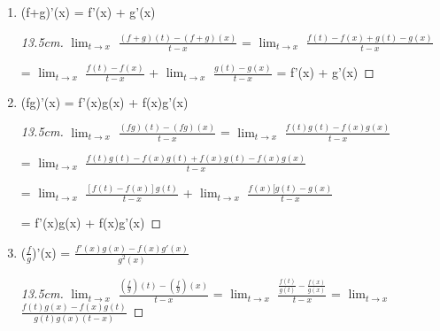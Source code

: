    \begin{enumerate}[label=(\alph*), leftmargin=1cm, itemsep=0.1cm]
        \item (f+g)'(x) = f'(x) + g'(x)
        
            \begin{proof}[13.5cm]
                $\lim_{t \rightarrow x}$ $\frac{(f+g)(t) - (f+g)(x)}{t - x}$
                = $\lim_{t \rightarrow x}$ $\frac{f(t) - f(x) + g(t) - g(x)}{t - x}$
                
                \hspace{4cm}
                = $\lim_{t \rightarrow x}$ $\frac{f(t) - f(x)}{t - x}$
                + $\lim_{t \rightarrow x}$ $\frac{g(t) - g(x)}{t - x}$
                = f'(x) + g'(x)
            \end{proof}
        
        \item (fg)'(x) = f'(x)g(x) + f(x)g'(x)

            \begin{proof}[13.5cm]
                $\lim_{t \rightarrow x}$ $\frac{(fg)(t) - (fg)(x)}{t - x}$
                = $\lim_{t \rightarrow x}$ $\frac{f(t)g(t) - f(x)g(x)}{t - x}$

                \hspace{3.5cm}
                = $\lim_{t \rightarrow x}$ $\frac{f(t)g(t)-f(x)g(t)+f(x)g(t)-f(x)g(x)}
                                                {t - x}$
                
                \hspace{3.5cm}
                = $\lim_{t \rightarrow x}$ $\frac{[f(t)-f(x)]g(t)}{t - x}$
                + $\lim_{t \rightarrow x}$ $\frac{f(x)[g(t)-g(x)}{t - x}$
                
                \hspace{3.5cm}
                = f'(x)g(x) + f(x)g'(x)
            \end{proof}

        \item ($\frac{f}{g}$)'(x) = $\frac{f'(x)g(x) - f(x)g'(x)}{g^2(x)}$
        
            \begin{proof}[13.5cm]
                $\lim_{t \rightarrow x}$ $\frac{(\frac{f}{g})(t)
                                                - (\frac{f}{g})(x)}{t - x}$
                = $\lim_{t \rightarrow x}$ $\frac{\frac{f(t)}{g(t)}
                                                - \frac{f(x)}{g(x)}}{t - x}$
                = $\lim_{t \rightarrow x}$ $\frac{f(t)g(x) - f(x)g(t)}
                                                    {g(t)g(x)(t-x)}$
                

\end{proof}
\end{enumerate}
